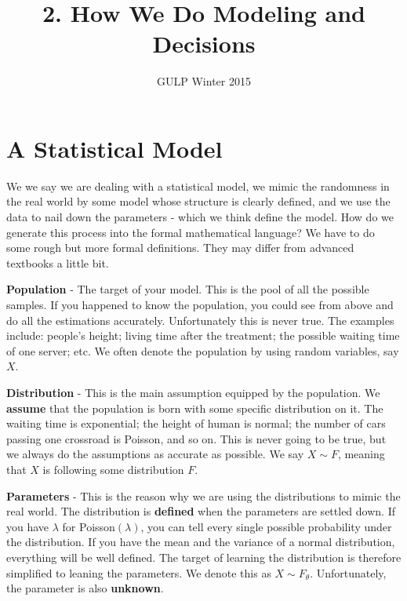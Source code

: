 \documentclass[12pt]{article}
\newcommand{\1}{\mathbbm{1}}
\begin{document}
\title{2. How We Do Modeling and Decisions}%
\author{GULP Winter 2015} %
\maketitle

\section{A Statistical Model}

We we say we are dealing with a statistical model, we mimic the randomness in the real world by some model whose structure is clearly defined, and we use the data to nail down the parameters - which we think define the model. How do we generate this process into the formal mathematical language? We have to do some rough but more formal definitions. They may differ from advanced textbooks a little bit.

\textbf{Population} - The target of your model. This is the pool of all the possible samples. If you happened to know the population, you could see from above and do all the estimations accurately. Unfortunately this is never true. The examples include: people's height; living time after the treatment; the possible waiting time of one server; etc. We often denote the population by using random variables, say $X$.

\textbf{Distribution} - This is the main assumption equipped by the population. We \textbf{assume} that the population is born with some specific distribution on it. The waiting time is exponential; the height of human is normal; the number of cars passing one crossroad is Poisson, and so on. This is never going to be true, but we always do the assumptions as accurate as possible. We say $X \sim F$, meaning that $X$ is following some distribution $F$.

\textbf{Parameters} - This is the reason why we are using the distributions to mimic the real world. The distribution is \textbf{defined} when the parameters are settled down. If you have $\lambda$ for Poisson$(\lambda)$, you can tell every single possible probability under the distribution. If you have the mean and the variance of a normal distribution, everything will be well defined. The target of learning the distribution is therefore simplified to leaning the parameters. We denote this as $X \sim F_\theta$. Unfortunately, the parameter is also \textbf{unknown}.
\end{document}

